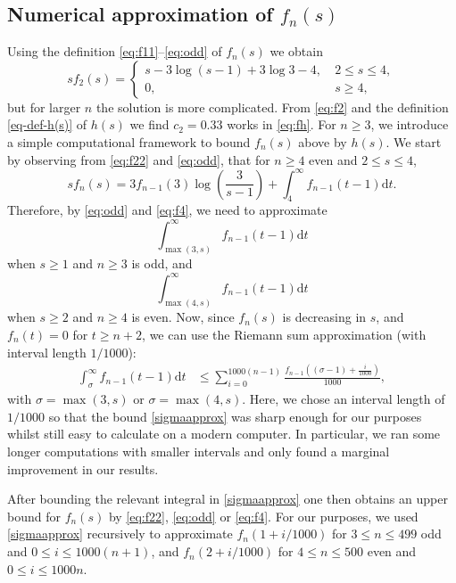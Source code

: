 \documentclass[12pt]{amsart}
\begin{document}
\subsection{Numerical approximation of $f_n(s)$}
\label{EXPS}
Using the definition \eqref{eq:f11}--\eqref{eq:odd} of $f_n(s)$ we obtain
\begin{equation}
\label{eq:f2}
sf_2(s)= \begin{cases} 
      s-3\log(s-1)+3 \log 3-4,~& 2\le s \le 4, \\
      0,~& s\ge 4,
      \end{cases} 
\end{equation}
but for larger $n$ the solution is more complicated. From \eqref{eq:f2} and the definition \eqref{eq-def-h(s)} of $h(s)$ we find $c_2=0.33$ works in \eqref{eq:fh}. For $n\ge 3$, we introduce a simple computational framework to bound $f_n(s)$ above by $h(s)$. We start by observing from \eqref{eq:f22} and \eqref{eq:odd}, that for $n\ge 4$ even and $2\le s \le 4$,
\begin{equation}
\label{eq:f4}
sf_n(s)=3f_{n-1}(3)\log\left(\frac{3}{s-1}\right)+\int_4^{\infty}f_{n-1}(t-1)\mathrm{d}t.
\end{equation}
Therefore, by \eqref{eq:odd} and \eqref{eq:f4}, we need to approximate 
\begin{equation*}
    \int_{\max(3,s)}^\infty f_{n-1}(t-1)\mathrm{d}t
\end{equation*}
when $s\ge 1$ and $n\ge 3$ is odd, and
\begin{equation*}
    \int_{\max(4,s)}^\infty f_{n-1}(t-1)\mathrm{d}t
\end{equation*}
when $s\ge 2$ and $n\ge 4$ is even. Now, since $f_n(s)$ is decreasing in $s$, and $f_n(t)=0$ for $t\ge n+2$, we can use the Riemann sum approximation (with interval length $1/1000$):
\begin{align}
    \int_{\sigma}^\infty f_{n-1}(t-1)\mathrm{d}t&\le\sum_{i=0}^{1000(n-1)}\frac{f_{n-1}\left((\sigma-1)+\frac{i}{1000}\right)}{1000}\label{sigmaapprox},
\end{align}
with $\sigma=\max(3,s)$ or $\sigma=\max(4,s)$. Here, we chose an interval length of $1/1000$ so that the bound \eqref{sigmaapprox} was sharp enough for our purposes whilst still easy to calculate on a modern computer. In particular, we ran some longer computations with smaller intervals and only found a marginal improvement in our results. 

After bounding the relevant integral in \eqref{sigmaapprox} one then obtains an upper bound for $f_n(s)$ by \eqref{eq:f22}, \eqref{eq:odd} or \eqref{eq:f4}. For our purposes, we used \eqref{sigmaapprox} recursively to approximate $f_n(1+i/1000)$ for $3\le n\le 499$ odd and $0\le i\le 1000(n+1)$, and $f_n(2+i/1000)$ for $4\le n\le 500$ even and $0\le i\le 1000n$.
\end{document}
